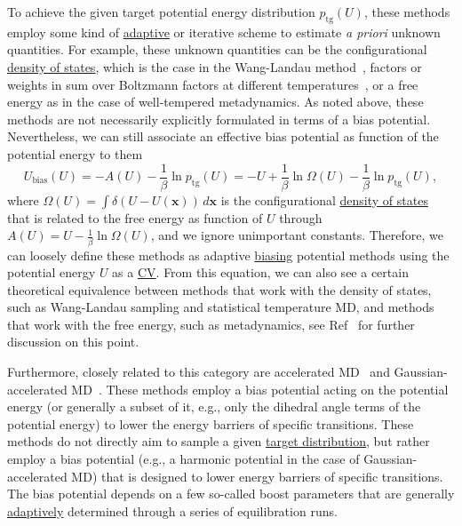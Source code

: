 \documentclass[9pt,review]{livecoms}
\newcommand{\vx}{\mathbf{x}}
\begin{document}
To achieve the given target potential energy distribution $p_{\mathrm{tg}}(U)$, these methods employ some kind of \hyperlink{ref:Adaptive} {adaptive} or iterative scheme to estimate \textit{a priori} unknown quantities. For example, these unknown quantities can be the configurational \hyperlink{ref:density_of_states}{density of states}, which is the case in the Wang-Landau method~\cite{wang-landau:prl:2001:wang-landau,Kim2006_PRL_STMD,DePablo_DOS_2012}, factors or weights in sum over Boltzmann factors at different temperatures~\cite{Gao_ITS_2008,invernizzi2020unified}, or a free energy as in the case of well-tempered metadynamics. As noted above, these methods are not necessarily explicitly formulated in terms of a bias potential. Nevertheless, we can still associate an effective bias potential as function of the potential energy to them
\begin{equation}
U_\mathrm{bias}(U) = - A(U) -\frac{1}{\beta} \ln p_{\mathrm{tg}}(U) = - U + \frac{1}{\beta} \ln \Omega(U) -\frac{1}{\beta} \ln p_{\mathrm{tg}}(U),
\end{equation}
where $\Omega(U) = \int \delta(U-U(\vx)) \, d\vx$ is the configurational \hyperlink{ref:density_of_states}{density of states} that is related to the free energy as function of $U$ through $A(U)=U - \frac{1}{\beta} \ln \Omega(U)$, and we ignore unimportant constants. Therefore, we can loosely define these methods as adaptive \hyperlink{ref:biasingE} {biasing} potential methods using the potential energy $U$ as a \hyperlink{ref:CV} {CV}. From this equation, we can also see a certain theoretical equivalence between methods that work with the density of states, such as Wang-Landau sampling and statistical temperature MD, and methods that work with the free energy, such as metadynamics, see Ref~\cite{Junghans2014wte-wl} for further discussion on this point.

Furthermore, closely related to this category are accelerated MD~\cite{Hamelberg2004} and Gaussian-accelerated MD~\cite{Miao2017, Wang2021}. These methods employ a bias potential acting on the potential energy (or generally a subset of it, e.g., only the dihedral angle terms of the potential energy) to lower the energy barriers of specific transitions. These methods do not directly aim to sample a given \hyperlink{ref:targetdist} {target distribution}, but rather employ a bias potential (e.g., a harmonic potential in the case of Gaussian-accelerated MD) that is designed to lower energy barriers of specific transitions. The bias potential depends on a few so-called boost parameters that are generally \hyperlink{ref:Adaptive} {adaptively} determined through a series of equilibration runs.
\end{document}
